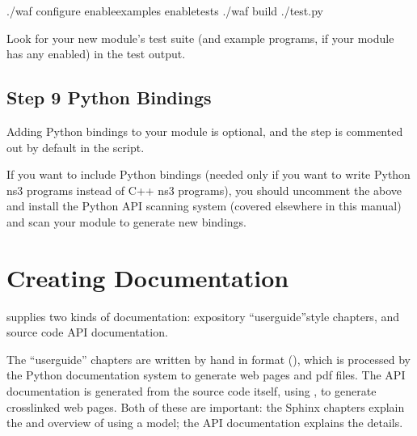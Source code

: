 \documentclass[letterpaper,10pt,english]{sphinxmanual}
\renewcommand{\sphinxcode}[1]{\texttt{\small{#1}}}
\begin{document}
\begin{sphinxVerbatim}[commandchars=\\\{\}]
\PYGZdl{} ./waf configure \PYGZhy{}\PYGZhy{}enable\PYGZhy{}examples \PYGZhy{}\PYGZhy{}enable\PYGZhy{}tests
\PYGZdl{} ./waf build
\PYGZdl{} ./test.py
\end{sphinxVerbatim}

Look for your new module’s test suite (and example programs,
if your module has any enabled) in the test output.


\subsection{Step 9 \sphinxhyphen{} Python Bindings}
\label{\detokenize{new-modules:step-9-python-bindings}}
Adding Python bindings to your module is optional, and the step is
commented out by default in the \sphinxcode{} script.

\begin{sphinxVerbatim}[commandchars=\\\{\}]
\end{sphinxVerbatim}

If you want to include Python bindings (needed only if you want
to write Python ns\sphinxhyphen{}3 programs instead of C++ ns\sphinxhyphen{}3 programs), you
should uncomment the above and install the Python API scanning
system (covered elsewhere in this manual) and scan your module to
generate new bindings.


\section{Creating Documentation}
\label{\detokenize{documentation:creating-documentation}}\label{\detokenize{documentation::doc}}
 supplies two kinds of documentation:  expository “user\sphinxhyphen{}guide”\sphinxhyphen{}style
chapters, and source code API documentation.

The “user\sphinxhyphen{}guide” chapters are written by hand in 
format (\sphinxcode{}), which is processed by the Python documentation
system  to generate web pages and pdf files.
The API documentation is generated from the source code itself,
using , to generate cross\sphinxhyphen{}linked web pages.
Both of these are important:  the Sphinx chapters explain the 
and overview of using a model; the API documentation explains the
 details.
\end{document}
